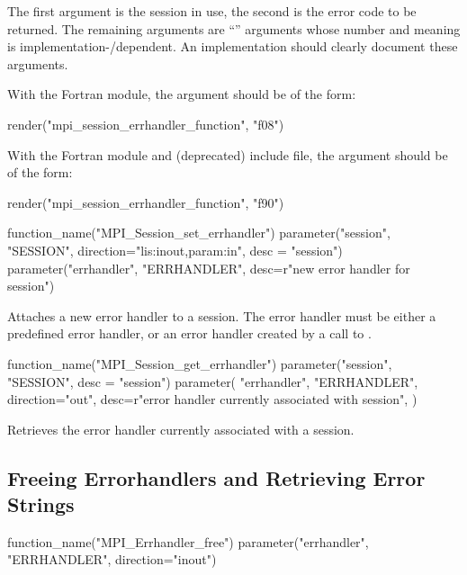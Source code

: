 The first argument is the session in use, the second
is the error code to be returned.
The remaining arguments are ``'' arguments
whose number and meaning is implementation\hyphen/dependent.  An implementation
should clearly document these arguments.

\noindent
With the Fortran  module, the  argument should be of the form:

\begin{mpi-binding}
    render("mpi_session_errhandler_function", "f08")
\end{mpi-binding}

\noindent
With the Fortran  module and (deprecated)  include file,
the  argument should be of the form:

\begin{mpi-binding}
    render("mpi_session_errhandler_function", "f90")
\end{mpi-binding}

%
%
\begin{mpi-binding}
    function_name("MPI_Session_set_errhandler")
    parameter("session", "SESSION", direction="lis:inout,param:in", desc = "session")
    parameter("errhandler", "ERRHANDLER", desc=r"new error handler for session")
\end{mpi-binding}

Attaches a new error handler to a session.  The error handler must be
either a predefined error
handler, or an error handler created by a call to
.

%
%
\begin{mpi-binding}
    function_name("MPI_Session_get_errhandler")
    parameter("session", "SESSION", desc = "session")
    parameter(
        "errhandler",
        "ERRHANDLER",
        direction="out",
        desc=r"error handler currently associated with session",
    )
\end{mpi-binding}

Retrieves the error handler currently associated with a session.

\subsection{Freeing Errorhandlers and Retrieving Error Strings}

%
\begin{mpi-binding}
    function_name("MPI_Errhandler_free")
    parameter("errhandler", "ERRHANDLER", direction="inout")
\end{mpi-binding}

